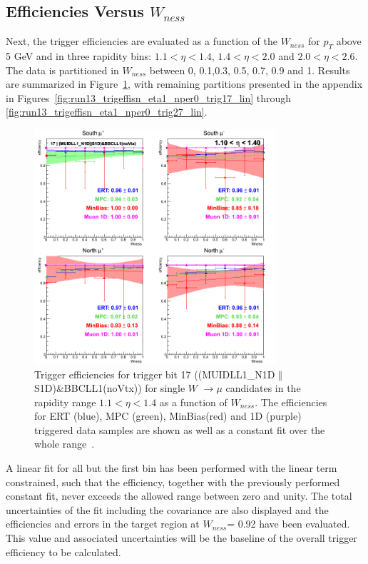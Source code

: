 \clearpage
\subsection{Efficiencies Versus $W_{ness}$}

Next, the trigger efficiencies are evaluated as a function of the $W_{ness}$ for
$p_T$ above 5 GeV and in three rapidity bins: $1.1 < \eta < 1.4$, $1.4 < \eta <
2.0$ and $2.0 < \eta < 2.6$. The data is partitioned in $W_{ness}$ between 0,
0.1,0.3, 0.5, 0.7, 0.9 and 1. Results are summarized in
Figure~\ref{fig:run13_trigeffisn_eta0_nper0_trig17_lin}, with remaining
partitions presented in the appendix in
Figures~\ref{fig:run13_trigeffisn_eta1_nper0_trig17_lin} through
\ref{fig:run13_trigeffisn_eta1_nper0_trig27_lin}.

\begin{figure}[ht]
  \centering
  \includegraphics[width=0.8\textwidth]{./figures/run13_trigeffisn_eta0_trig17_lin.png}
  \caption{
    Trigger efficiencies for trigger bit 17
    ((MUIDLL1\_N1D$\|$S1D)\&BBCLL1(noVtx)) for single $W$ $\rightarrow \mu$
    candidates in the rapidity range $ 1.1 < \eta < 1.4$ as a function of
    $W_{ness}$. The efficiencies for ERT (blue), MPC (green), MinBias(red) and
    1D (purple) triggered data samples are shown as well as a constant fit over
    the whole range~\cite{Seidl2014}.
  }
  \label{fig:run13_trigeffisn_eta0_nper0_trig17_lin} 
\end{figure}

A linear fit for all but the first bin has been performed with the linear term
constrained, such that the efficiency, together with the previously performed
constant fit, never exceeds the allowed range between zero and unity. The total
uncertainties of the fit including the covariance are also displayed and the
efficiencies and errors in the target region at $W_{ness}$= 0.92 have been
evaluated.  This value and associated uncertainties will be the baseline of the
overall trigger efficiency to be calculated.

